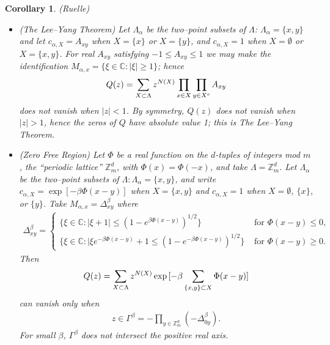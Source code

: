 \documentclass[english,12pt]{ttuthes}
\newtheorem{corollary}{Corollary}[chapter]
\begin{document}
\begin{corollary}(Ruelle)
  \label{cor:RuelleLeeYangExtension}  
  \begin{itemize}
    \item[\it{(i)}](The Lee--Yang Theorem)
      Let $\Lambda_\alpha$ be the two--point subsets of $\Lambda$: $\Lambda_\alpha=\{x,y\}$ and let 
      $c_{\alpha,X}=A_{xy}$ when $X=\{x\}$ or $X=\{y\}$, and $c_{\alpha,X}=1$ when
      $X=\emptyset$ or $X=\{x,y\}$. For real $A_{xy}$ satisfying $-1\leq A_{xy}\leq1$ we
      may make the identification $M_{\alpha,x}=\{\xi\in\mathbb{C}:|\xi|\geq1\}$; hence
      \begin{align*}
        Q(z)=\sum_{X\subset\Lambda}z^{N(X)}\prod_{x\in X}\prod_{y\in X^c}A_{xy}\notag
      \end{align*}
      does not vanish when $|z|<1$. By symmetry, $Q(z)$ does not vanish
      when $|z|>1$, hence the zeros of $Q$ have absolute value 1; this
      is The Lee--Yang Theorem.
      \item[\it{(ii)}](Zero Free Region)
        Let $\Phi$ be a real function on the $d$-tuples of integers mod
        $m$, the ``periodic lattice'' $\mathbb{Z}_m^d$, with
        $\Phi(x)=\Phi(-x)$, and take $\Lambda=\mathbb{Z}_m^d$. Let $\Lambda_\alpha$ be the
        two--point subsets of $\Lambda:\Lambda_\alpha=\{x,y\}$, and write
        $c_{\alpha,X}=\exp{[-\beta\Phi(x-y)]}$ when $X=\{x,y\}$ and $c_{\alpha,X}=1$ when
        $X=\emptyset$, $\{x\}$, or $\{y\}$. Take $M_{\alpha,x}=\Delta_{xy}^\beta$ where
  \begin{align*}
    \Delta_{xy}^\beta=\left\{
    \begin{array}{ll}
       \{\xi\in\mathbb{C}:|\xi+1|\leq(1-e^{\beta\Phi(x-y)})^{1/2}\} & \text{ for }
    \Phi(x-y)\leq0,\\
    \{\xi\in\mathbb{C}:|\xi e^{-\beta\Phi(x-y)}+1\leq (1-e^{-\beta\Phi(x-y)})^{1/2}\} &\text{ for }
    \Phi(x-y)\geq0.
    \end{array}
    \right.
  \end{align*}
   Then
   \begin{align*}
     Q(z)=\sum_{X\subset\Lambda}z^{N(X)}\exp{[-\beta\sum_{\{x,y\}\subset X}\Phi(x-y)]}\notag
   \end{align*}
   can vanish only when
   \begin{align*}
     z\in\Gamma^\beta=-\prod_{y\in\mathbb{Z}_m^d}(-\Delta_{0y}^\beta).
   \end{align*}
  For small $\beta$, $\Gamma^\beta$ does not intersect the positive real axis.
\end{itemize}
\end{corollary}
%
\end{document}

